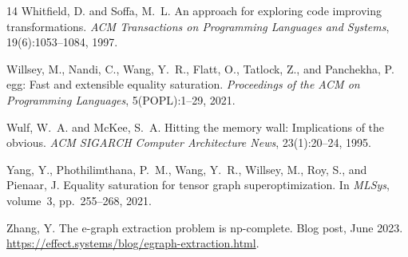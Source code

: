 \documentclass[11pt]{article}
\begin{document}
\begin{thebibliography}{14}
Whitfield, D. and Soffa, M.~L.
\newblock An approach for exploring code improving transformations.
\newblock \emph{ACM Transactions on Programming Languages and Systems}, 19(6):1053--1084, 1997.

Willsey, M., Nandi, C., Wang, Y.~R., Flatt, O., Tatlock, Z., and Panchekha, P.
\newblock egg: Fast and extensible equality saturation.
\newblock \emph{Proceedings of the ACM on Programming Languages}, 5(POPL):1--29, 2021.

Wulf, W.~A. and McKee, S.~A.
\newblock Hitting the memory wall: Implications of the obvious.
\newblock \emph{ACM SIGARCH Computer Architecture News}, 23(1):20--24, 1995.

Yang, Y., Phothilimthana, P.~M., Wang, Y.~R., Willsey, M., Roy, S., and Pienaar, J.
\newblock Equality saturation for tensor graph superoptimization.
\newblock In \emph{MLSys}, volume~3, pp.~255--268, 2021.

Zhang, Y.
\newblock The e-graph extraction problem is np-complete.
\newblock Blog post, June 2023.
\newblock \url{https://effect.systems/blog/egraph-extraction.html}.

\end{thebibliography}
\end{document}
